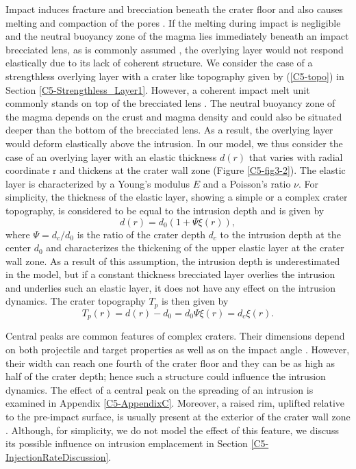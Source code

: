 Impact  induces  fracture and  brecciation  beneath  the crater  floor
\citep{Wilhelms:1987vb,Melosh:1989jl,Jolliff:2000vf}  and also  causes
melting        and        compaction        of        the        pores
\citep{Melosh:1989jl,Schultz:1976kt}.  If the melting during impact is
negligible and the neutral buoyancy zone of the magma lies immediately
beneath   an  impact   brecciated   lens,  as   is  commonly   assumed
\citep{Schultz:1976kt,Wichman:1996bj,Jozwiak:2012dq},   the  overlying
layer  would not  respond  elastically  due to  its  lack of  coherent
structure. We consider the case of a strengthless overlying layer with
a  crater   like  topography  given  by   (\ref{C5-topo})  in  Section
\ref{C5-Strengthless_Layer1}.   However, a  coherent impact  melt unit
commonly     stands    on     top    of     the    brecciated     lens
\citep{Melosh:1989jl,Schultz:1976kt}.   The neutral  buoyancy zone  of
the magma  depends on the  crust and magma  density and could  also be
situated deeper than the bottom of  the brecciated lens.  As a result,
the overlying layer would deform  elastically above the intrusion.  In
our model,  we thus consider  the case of  an overlying layer  with an
elastic thickness  $d(r)$ that varies  with radial coordinate  r and
thickens  at  the  crater  wall zone  (Figure  \ref{C5-fig3-2}).   The
elastic  layer  is  characterized  by  a Young's  modulus  $E$  and  a
Poisson's ratio $\nu$.   For simplicity, the thickness  of the elastic
layer, showing a simple or  a complex crater topography, is considered
to be equal to the intrusion depth and is given by
\begin{equation}
  d(r)=d_0(1+\Psi \xi(r)),
  \label{C5-3-2}
\end{equation}	
where $\Psi=d_{c}/d_0$ is the ratio of the crater depth $d_{c}$ to
the  intrusion depth  at the  center $d_0$  and characterizes  the
thickening of the  upper elastic layer at the crater  wall zone.  As a
result of  this assumption, the  intrusion depth is  underestimated in
the model, but  if a constant thickness brecciated  layer overlies the
intrusion and  underlies such an elastic  layer, it does not  have any
effect on the intrusion dynamics.  The crater topography $T_p$ is then
given by
\begin{equation}
  T_p(r)=d(r)-d_0=d_0\Psi\xi(r)=d_c\xi(r).
  \label{C5-topo1}
\end{equation}
	 
Central  peaks   are  common  features  of   complex  craters.   Their
dimensions depend on both projectile  and target properties as well as
on  the  impact  angle  \citep{Schultz:1994cv,Bray:2008fu}.   However,
their width can reach  one fourth of the crater floor  and they can be
as high  as half  of the  crater depth; hence  such a  structure could
influence the intrusion dynamics.  The effect of a central peak on the
spreading of an intrusion  is examined in Appendix \ref{C5-AppendixC}.
Moreover, a raised  rim, uplifted relative to  the pre-impact surface,
is  usually  present   at  the  exterior  of  the   crater  wall  zone
\citep{Pike:1976ei,Pike:1980eh}. Although,  for simplicity, we  do not
model the effect of this feature, we discuss its possible influence on
intrusion emplacement in Section \ref{C5-InjectionRateDiscussion}.
	 		 
